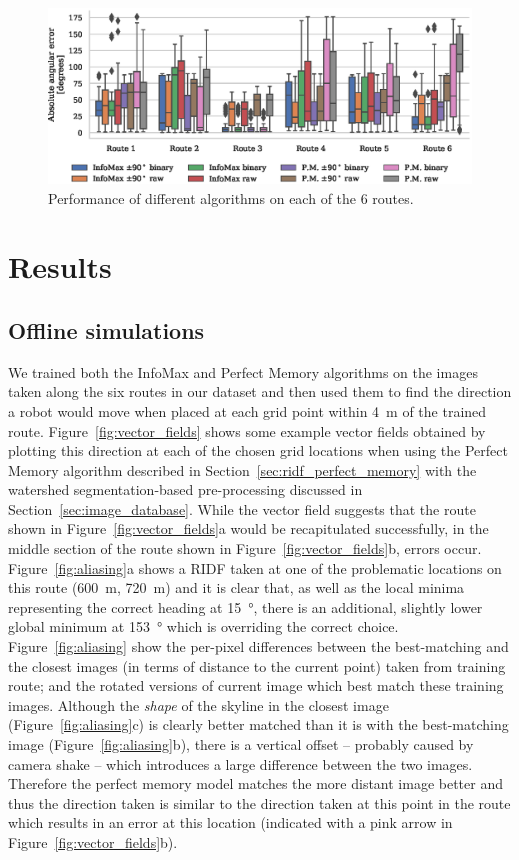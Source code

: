 \documentclass[letterpaper]{article}
\begin{document}
\begin{figure}[t]
    \centering
    \includegraphics{figures/route_benchmark.eps}
    \caption{Performance of different algorithms on each of the 6 routes.}
    \label{fig:route_benchmark}
\end{figure}

\section{Results}
\subsection{Offline simulations}
\label{sec:offline_simulations}
We trained both the InfoMax and Perfect Memory algorithms on the images taken along the six routes in our dataset and then used them to find the direction a robot would move when placed at each grid point within \SI{4}{\metre} of the trained route. 
Figure~\ref{fig:vector_fields} shows some example vector fields obtained by plotting this direction at each of the chosen grid locations when using the Perfect Memory algorithm described in Section~\ref{sec:ridf_perfect_memory} with the watershed segmentation-based pre-processing discussed in Section~\ref{sec:image_database}. 
While the vector field suggests that the route shown in Figure~\ref{fig:vector_fields}a would be recapitulated successfully, in the middle section of the route shown in Figure~\ref{fig:vector_fields}b, errors occur.
Figure~\ref{fig:aliasing}a shows a RIDF taken at one of the problematic locations on this route (\SI{600}{\metre}, \SI{720}{\metre}) and it is clear that, as well as the local minima representing the correct heading at \SI{15}{\degree}, there is an additional, slightly lower global minimum at \SI{153}{\degree} which is overriding the correct choice.
Figure~\ref{fig:aliasing} show the per-pixel differences between the best-matching and the closest images (in terms of distance to the current point) taken from training route; and the rotated versions of current image which best match these training images.
Although the \emph{shape} of the skyline in the closest image (Figure~\ref{fig:aliasing}c) is clearly better matched than it is with the best-matching image (Figure~\ref{fig:aliasing}b), there is a vertical offset -- probably caused by camera shake -- which introduces a large difference between the two images.
Therefore the perfect memory model matches the more distant image better and thus the direction taken is similar to the direction taken at this point in the route which results in an error at this location (indicated with a pink arrow in Figure~\ref{fig:vector_fields}b).
\end{document}
